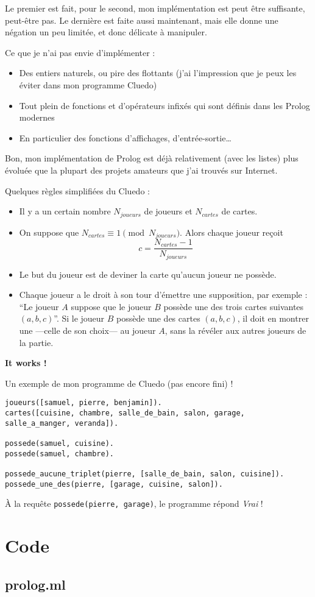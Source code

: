 \documentclass{article}
\newcommand\codefile[1]{\subsection{#1}\inputminted{ocaml}{../Code/#1}}
\begin{document}
Le premier est fait, pour le second, mon implémentation est peut être suffisante, peut-être pas. Le dernière est faite aussi maintenant, mais elle donne une négation un peu limitée, et donc délicate à manipuler.

Ce que je n'ai pas envie d'implémenter :

\begin{itemize}
  \item
    Des entiers naturels, ou pire des flottants (j'ai l'impression que je peux les éviter dans mon programme Cluedo)
  \item
    Tout plein de fonctions et d'opérateurs infixés qui sont définis dans les Prolog modernes
  \item
    En particulier des fonctions d'affichages, d'entrée-sortie\ldots{}
\end{itemize}

Bon, mon implémentation de Prolog est déjà relativement (avec les listes) plus évoluée que la plupart des projets amateurs que j'ai trouvés sur Internet.

Quelques règles simplifiées du Cluedo :

\begin{itemize}
  \item
    Il y a un certain nombre $N_{joueurs}$ de joueurs et $N_{cartes}$ de cartes.
  \item
    On suppose que $N_{cartes} \equiv 1 \pmod {N_{joueurs}}$. Alors chaque joueur reçoit \[c = \frac{N_{cartes}-1}{N_{joueurs}}\]
  \item
    Le but du joueur est de deviner la carte qu'aucun joueur ne possède.
  \item
    Chaque joueur a le droit à son tour d'émettre une supposition, par exemple : ``Le joueur $A$ suppose que le joueur $B$ possède une des trois cartes suivantes $(a, b, c)$''. Si le joueur $B$ possède une des cartes $(a, b, c)$, il doit en montrer une ---celle de son choix--- au joueur $A$, sans la révéler aux autres joueurs de la partie.
\end{itemize}

\textbf{It works !}

Un exemple de mon programme de Cluedo (pas encore fini) !

\begin{verbatim}
joueurs([samuel, pierre, benjamin]).
cartes([cuisine, chambre, salle_de_bain, salon, garage, salle_a_manger, veranda]).

possede(samuel, cuisine).
possede(samuel, chambre).

possede_aucune_triplet(pierre, [salle_de_bain, salon, cuisine]).
possede_une_des(pierre, [garage, cuisine, salon]).
\end{verbatim}

À la requête \texttt{possede(pierre, garage)}, le programme répond \emph{Vrai} !




\appendix

\section{Code}
\codefile{prolog.ml}
\end{document}
